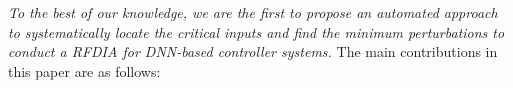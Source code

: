{\textit{To the best of our knowledge, we are the first to  propose an automated approach to systematically locate the critical inputs and find the minimum perturbations to conduct a \ac{RFDIA} for DNN-based controller systems.}}
\newline
The main contributions in this paper are as follows:
\newline
